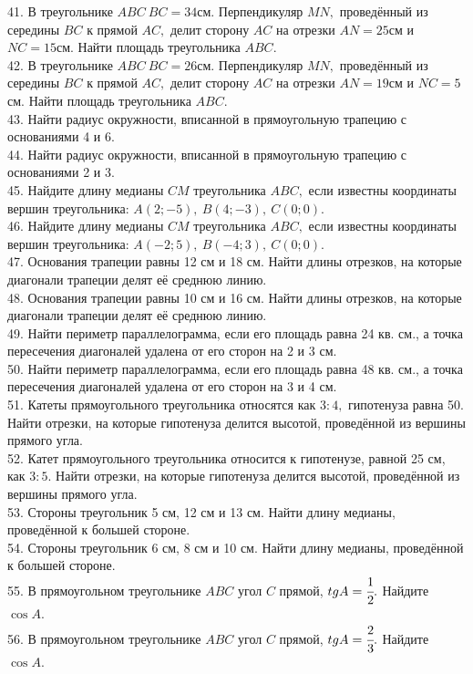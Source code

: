 \documentclass[12pt]{article}
\begin{document}
41. В треугольнике $ABC\ BC=34$см. Перпендикуляр $MN,$ проведённый из середины $BC$ к прямой $AC,$ делит сторону $AC$ на отрезки $AN=25$см и $NC=15$см. Найти площадь треугольника $ABC.$\\
42. В треугольнике $ABC\ BC=26$см. Перпендикуляр $MN,$ проведённый из середины $BC$ к прямой $AC,$ делит сторону $AC$ на отрезки $AN=19$см и $NC=5$см. Найти площадь треугольника $ABC.$\\
43. Найти радиус окружности, вписанной в прямоугольную трапецию с основаниями 4 и 6.\\
44. Найти радиус окружности, вписанной в прямоугольную трапецию с основаниями 2 и 3.\\
45. Найдите длину медианы $CM$ треугольника $ABC,$ если известны координаты вершин треугольника: $A(2;-5),\ B(4;-3),\ C(0;0).$\\
46. Найдите длину медианы $CM$ треугольника $ABC,$ если известны координаты вершин треугольника: $A(-2;5),\ B(-4;3),\ C(0;0).$\\
47. Основания трапеции равны 12 см и 18 см. Найти длины отрезков, на которые диагонали трапеции делят её среднюю линию.\\
48. Основания трапеции равны 10 см и 16 см. Найти длины отрезков, на которые диагонали трапеции делят её среднюю линию.\\
49. Найти периметр параллелограмма, если его площадь равна 24 кв. см., а точка пересечения диагоналей удалена от его сторон на 2 и 3 см.\\
50. Найти периметр параллелограмма, если его площадь равна 48 кв. см., а точка пересечения диагоналей удалена от его сторон на 3 и 4 см.\\
51. Катеты прямоугольного треугольника относятся как $3:4,$ гипотенуза равна 50. Найти отрезки, на которые гипотенуза делится высотой, проведённой из вершины прямого угла.\\
52. Катет прямоугольного треугольника относится к гипотенузе, равной 25 см, как $3:5.$ Найти отрезки, на которые гипотенуза делится высотой, проведённой из вершины прямого угла.\\
53. Стороны треугольник 5 см, 12 см и 13 см. Найти длину медианы, проведённой к большей стороне.\\
54. Стороны треугольник 6 см, 8 см и 10 см. Найти длину медианы, проведённой к большей стороне.\\
55. В прямоугольном треугольнике $ABC$ угол $C$ прямой, $tg A=\cfrac{1}{2}.$ Найдите $\cos A.$\\
56. В прямоугольном треугольнике $ABC$ угол $C$ прямой, $tg A=\cfrac{2}{3}.$ Найдите $\cos A.$\\
\end{document}
